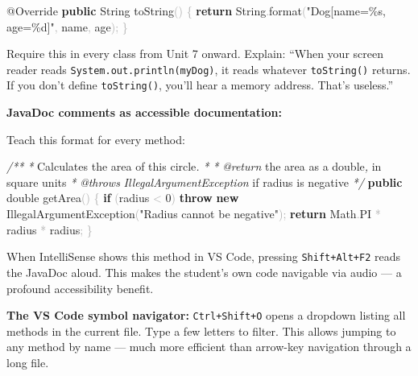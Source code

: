 \documentclass[
  justified,
  openright,
]{tufte-book}
\newcommand{\KeywordTok}[1]{\textcolor{CodeKeyword}{\textbf{#1}}}  %
\newcommand{\StringTok}[1]{\textcolor{CodeString}{#1}}              %
\newcommand{\CommentTok}[1]{\textcolor{CodeComment}{\textit{#1}}}  %
\newcommand{\CodeNumTok}[1]{\textcolor{CodeNumber}{#1}}             %
\newcommand{\CodeFuncTok}[1]{\textcolor{CodeKeyword}{#1}}           %
\newcommand{\CodeTypeTok}[1]{\textcolor{CodeType}{#1}}              %
\newcommand{\OperatorTok}[1]{\textcolor{DarkGray}{#1}}              %
\newenvironment{Shaded}{%
  \begin{mdframed}[style=TufteCode]%
}{%
  \end{mdframed}%
}
\begin{document}
\begin{Shaded}
\begin{Highlighting}[]
\CodeTypeTok{@Override}
\KeywordTok{public} String \CodeFuncTok{toString}\OperatorTok{()} \OperatorTok{\{}
    \KeywordTok{return} String\OperatorTok{.}\CodeFuncTok{format}\OperatorTok{(}\StringTok{"Dog[name=}\StringTok{\%s}\StringTok{, age=}\StringTok{\%d}\StringTok{]"}\OperatorTok{,} name\OperatorTok{,} age\OperatorTok{);}
\OperatorTok{\}}
\end{Highlighting}
\end{Shaded}

Require this in every class from Unit 7 onward. Explain: ``When your
screen reader reads \texttt{System.out.println(myDog)}, it reads
whatever \texttt{toString()} returns. If you don't define
\texttt{toString()}, you'll hear a memory address. That's useless.''

\textbf{JavaDoc comments as accessible documentation:}

Teach this format for every method:

\begin{Shaded}
\begin{Highlighting}[]
\CommentTok{/**}
 \CommentTok{*} Calculates the area of this circle\CommentTok{.}
 \CommentTok{*}
 \CommentTok{*} \CommentTok{@return} the area as a double\CommentTok{,} in square units
 \CommentTok{*} \CommentTok{@throws}\CommentTok{ }\CommentTok{IllegalArgumentException}\CommentTok{ }if radius is negative
 \CommentTok{*/}
\KeywordTok{public} \CodeTypeTok{double} \CodeFuncTok{getArea}\OperatorTok{()} \OperatorTok{\{}
    \KeywordTok{if} \OperatorTok{(}radius \OperatorTok{\textless{}} \CodeNumTok{0}\OperatorTok{)} \KeywordTok{throw} \KeywordTok{new} IllegalArgumentException\OperatorTok{(}\StringTok{"Radius cannot be negative"}\OperatorTok{);}
    \KeywordTok{return} Math\OperatorTok{.}\CodeFuncTok{PI} \OperatorTok{*} radius \OperatorTok{*} radius\OperatorTok{;}
\OperatorTok{\}}
\end{Highlighting}
\end{Shaded}

When IntelliSense shows this method in VS Code, pressing
\texttt{Shift+Alt+F2} reads the JavaDoc aloud. This makes the student's
own code navigable via audio --- a profound accessibility benefit.

\textbf{The VS Code symbol navigator:} \texttt{Ctrl+Shift+O} opens a
dropdown listing all methods in the current file. Type a few letters to
filter. This allows jumping to any method by name --- much more
efficient than arrow-key navigation through a long file.
\end{document}
